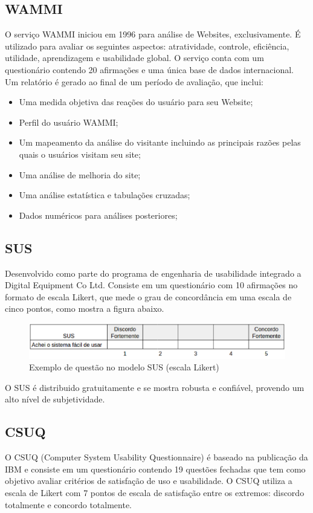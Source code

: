 \subsection{WAMMI}
O serviço WAMMI iniciou em 1996 para análise de Websites, exclusivamente. É utilizado para avaliar os seguintes aspectos: atratividade, controle, eficiência, utilidade, aprendizagem e usabilidade global. O serviço conta com um questionário contendo 20 afirmações e uma única base de dados internacional. Um relatório é gerado ao final de um período de avaliação, que inclui:
\begin{itemize}
	\item Uma medida objetiva das reações do usuário para seu Website;
	\item Perfil do usuário WAMMI;
	\item Um mapeamento da análise do visitante incluindo as principais razões pelas quais o usuários visitam seu site;
	\item Uma análise de melhoria do site;
	\item Uma análise estatística e tabulações cruzadas;
	\item Dados numéricos para análises posteriores;
\end{itemize}

\subsection{SUS}
Desenvolvido como parte do programa de engenharia de usabilidade integrado a Digital Equipment Co Ltd. Consiste em um questionário com 10 afirmações no formato de escala Likert, que mede o grau de concordância em uma escala de cinco pontos, como mostra a figura abaixo.

\begin{figure}[h]
	\centering
	\includegraphics[scale=0.5]{figuras/sus.eps}
	\caption{Exemplo de questão no modelo SUS (escala Likert)}
\end{figure}

O SUS é distribuido gratuitamente e se mostra robusta e confiável, provendo um alto nível de subjetividade.

\subsection{CSUQ}
O CSUQ (Computer System Usability Questionnaire) é baseado na publicação da IBM e consiste em um questionário contendo 19 questões fechadas que tem como objetivo avaliar critérios de satisfação de uso e usabilidade.
O CSUQ utiliza a escala de Likert com 7 pontos de escala de satisfação entre os extremos: discordo totalmente e concordo totalmente.

